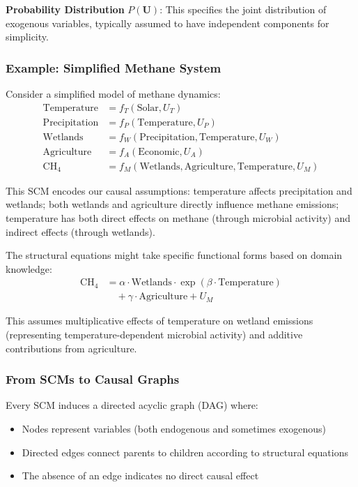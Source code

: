 \textbf{Probability Distribution} $P(\mathbf{U})$: This specifies the joint distribution of exogenous variables, typically assumed to have independent components for simplicity.

\subsubsection{Example: Simplified Methane System}

Consider a simplified model of methane dynamics:
\begin{align}
\text{Temperature} &= f_T(\text{Solar}, U_T) \\
\text{Precipitation} &= f_P(\text{Temperature}, U_P) \\
\text{Wetlands} &= f_W(\text{Precipitation}, \text{Temperature}, U_W) \\
\text{Agriculture} &= f_A(\text{Economic}, U_A) \\
\text{CH}_4 &= f_M(\text{Wetlands}, \text{Agriculture}, \text{Temperature}, U_M)
\end{align}

This SCM encodes our causal assumptions: temperature affects precipitation and wetlands; both wetlands and agriculture directly influence methane emissions; temperature has both direct effects on methane (through microbial activity) and indirect effects (through wetlands).

The structural equations might take specific functional forms based on domain knowledge:
\begin{align}
\text{CH}_4 &= \alpha \cdot \text{Wetlands} \cdot \exp(\beta \cdot \text{Temperature}) \\
&\quad + \gamma \cdot \text{Agriculture} + U_M
\end{align}

This assumes multiplicative effects of temperature on wetland emissions (representing temperature-dependent microbial activity) and additive contributions from agriculture.

\subsubsection{From SCMs to Causal Graphs}

Every SCM induces a directed acyclic graph (DAG) where:
\begin{itemize}
\item Nodes represent variables (both endogenous and sometimes exogenous)
\item Directed edges connect parents to children according to structural equations
\item The absence of an edge indicates no direct causal effect
\end{itemize}

